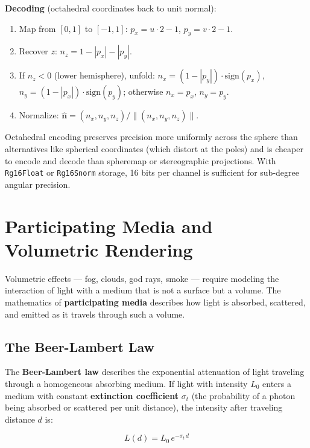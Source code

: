 \documentclass[
  11pt,
  letterpaper,
  DIV=11,
  numbers=noendperiod,
  twoside,
  open=right]{scrreprt}
\providecommand{\tightlist}{%
  \setlength{\itemsep}{0pt}\setlength{\parskip}{0pt}}
\begin{document}
\textbf{Decoding} (octahedral coordinates back to unit normal):

\begin{enumerate}
\def\labelenumi{\arabic{enumi}.}
\tightlist
\item
  Map from \([0, 1]\) to \([-1, 1]\): \(p_x = u \cdot 2 - 1\),
  \(p_y = v \cdot 2 - 1\).
\item
  Recover \(z\): \(n_z = 1 - |p_x| - |p_y|\).
\item
  If \(n_z < 0\) (lower hemisphere), unfold:
  \(n_x = (1 - |p_y|) \cdot \text{sign}(p_x)\),
  \(n_y = (1 - |p_x|) \cdot \text{sign}(p_y)\); otherwise \(n_x = p_x\),
  \(n_y = p_y\).
\item
  Normalize:
  \(\hat{\mathbf{n}} = (n_x, n_y, n_z) / \|(n_x, n_y, n_z)\|\).
\end{enumerate}

Octahedral encoding preserves precision more uniformly across the sphere
than alternatives like spherical coordinates (which distort at the
poles) and is cheaper to encode and decode than spheremap or
stereographic projections. With \texttt{Rg16Float} or \texttt{Rg16Snorm}
storage, 16 bits per channel is sufficient for sub-degree angular
precision.

\section{Participating Media and Volumetric
Rendering}\label{participating-media-and-volumetric-rendering}

Volumetric effects --- fog, clouds, god rays, smoke --- require modeling
the interaction of light with a medium that is not a surface but a
volume. The mathematics of \textbf{participating media} describes how
light is absorbed, scattered, and emitted as it travels through such a
volume.

\subsection{The Beer-Lambert Law}\label{the-beer-lambert-law}

The \textbf{Beer-Lambert law} describes the exponential attenuation of
light traveling through a homogeneous absorbing medium. If light with
intensity \(L_0\) enters a medium with constant \textbf{extinction
coefficient} \(\sigma_t\) (the probability of a photon being absorbed or
scattered per unit distance), the intensity after traveling distance
\(d\) is:

\[
L(d) = L_0 \, e^{-\sigma_t \, d}
\]
\end{document}
